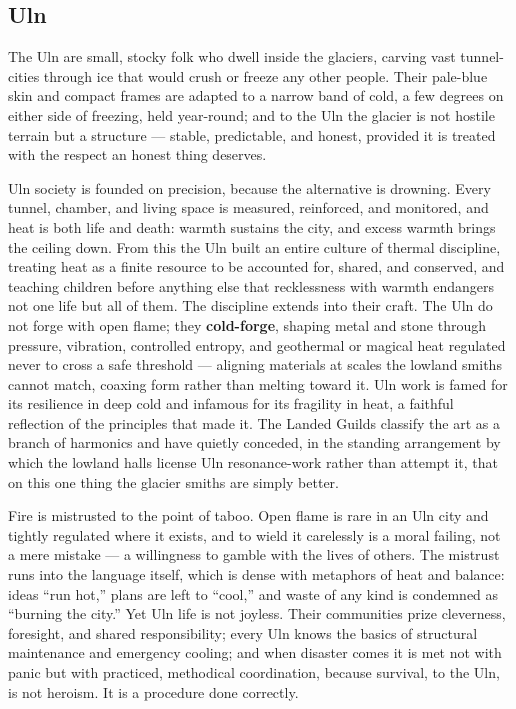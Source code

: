 \subsection{Uln}

The Uln are small, stocky folk who dwell inside the glaciers, carving vast tunnel-cities through ice that would crush or freeze any other people. Their pale-blue skin and compact frames are adapted to a narrow band of cold, a few degrees on either side of freezing, held year-round; and to the Uln the glacier is not hostile terrain but a structure --- stable, predictable, and honest, provided it is treated with the respect an honest thing deserves.

Uln society is founded on precision, because the alternative is drowning. Every tunnel, chamber, and living space is measured, reinforced, and monitored, and heat is both life and death: warmth sustains the city, and excess warmth brings the ceiling down. From this the Uln built an entire culture of thermal discipline, treating heat as a finite resource to be accounted for, shared, and conserved, and teaching children before anything else that recklessness with warmth endangers not one life but all of them. The discipline extends into their craft. The Uln do not forge with open flame; they \textbf{cold-forge}, shaping metal and stone through pressure, vibration, controlled entropy, and geothermal or magical heat regulated never to cross a safe threshold --- aligning materials at scales the lowland smiths cannot match, coaxing form rather than melting toward it. Uln work is famed for its resilience in deep cold and infamous for its fragility in heat, a faithful reflection of the principles that made it. The Landed Guilds classify the art as a branch of harmonics and have quietly conceded, in the standing arrangement by which the lowland halls license Uln resonance-work rather than attempt it, that on this one thing the glacier smiths are simply better.

Fire is mistrusted to the point of taboo. Open flame is rare in an Uln city and tightly regulated where it exists, and to wield it carelessly is a moral failing, not a mere mistake --- a willingness to gamble with the lives of others. The mistrust runs into the language itself, which is dense with metaphors of heat and balance: ideas ``run hot,'' plans are left to ``cool,'' and waste of any kind is condemned as ``burning the city.'' Yet Uln life is not joyless. Their communities prize cleverness, foresight, and shared responsibility; every Uln knows the basics of structural maintenance and emergency cooling; and when disaster comes it is met not with panic but with practiced, methodical coordination, because survival, to the Uln, is not heroism. It is a procedure done correctly.

